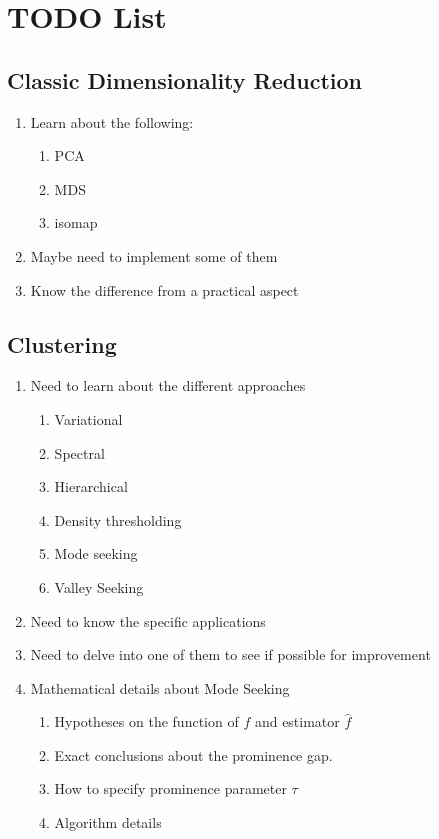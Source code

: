 \documentclass[10pt,a4paper]{report}
\begin{document}
\section{TODO List}
\subsection{Classic Dimensionality Reduction}
\begin{enumerate}
	\item Learn about the following:
	\begin{enumerate}
		\item PCA
		\item MDS
		\item isomap
	\end{enumerate}
	\item Maybe need to implement some of them
	\item Know the difference from a practical aspect
\end{enumerate}
\subsection{Clustering}
\begin{enumerate}
	\item Need to learn about the different approaches 
	\begin{enumerate}
		\item Variational
		\item Spectral
		\item Hierarchical
		\item Density thresholding
		\item Mode seeking
		\item Valley Seeking
	\end{enumerate}
	\item Need to know the specific applications
	\item Need to delve into one of them to see if possible for improvement
	\item Mathematical details about Mode Seeking
	\begin{enumerate}
		\item Hypotheses on the function of $f$ and estimator $\hat{f}$
		\item Exact conclusions about the prominence gap.
		\item How to specify prominence parameter $\tau$
		\item Algorithm details
	\end{enumerate}
\end{enumerate}
\end{document}
